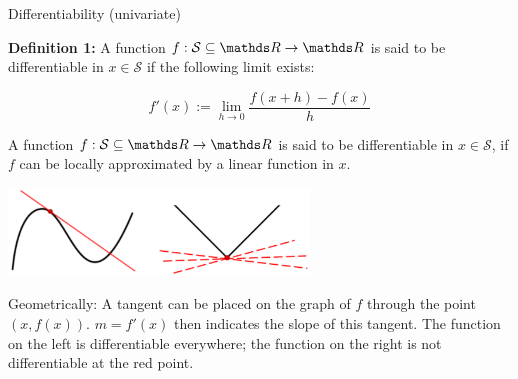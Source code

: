 \begin{vbframe}{Differentiability (univariate)}

\textbf{Definition 1:} A function $f: \mathcal{S} \subseteq \R \to \R$ is said to be differentiable in $x \in \mathcal{S}$ if the following limit exists:

$$
f'(x) := \lim_{h \to 0} \frac{f(x + h) - f(x)}{h}
$$

A function $f: \mathcal{S} \subseteq \R \to \R$ is said to be differentiable in $x \in \mathcal{S}$, if $f$ can be locally approximated by a linear function in $x$.

\begin{center}
\includegraphics[width = 0.6\textwidth]{figure_man/tangent.png} \\
\begin{footnotesize}
Geometrically: A tangent can be placed on the graph of $f$ through the point $(x, f(x))$. $m = f'(x)$ then indicates the slope of this tangent. The function on the left is differentiable everywhere; the function on the right is not differentiable at the red point. 
\end{footnotesize}
\end{center}








\end{vbframe}

